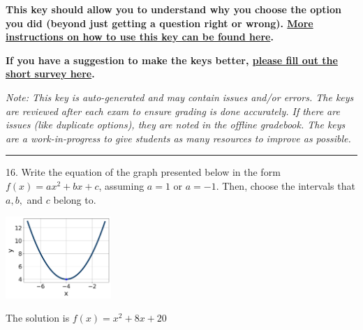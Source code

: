 \documentclass{article}[14pt]
\begin{document}
\textbf{This key should allow you to understand why you choose the option you did (beyond just getting a question right or wrong). \href{https://xronos.clas.ufl.edu/mac1105spring2020/courseDescriptionAndMisc/Exams/LearningFromResults}{More instructions on how to use this key can be found here}.}

\textbf{If you have a suggestion to make the keys better, \href{https://forms.gle/CZkbZmPbC9XALEE88}{please fill out the short survey here}.}

\textit{Note: This key is auto-generated and may contain issues and/or errors. The keys are reviewed after each exam to ensure grading is done accurately. If there are issues (like duplicate options), they are noted in the offline gradebook. The keys are a work-in-progress to give students as many resources to improve as possible.}

\rule{\textwidth}{0.4pt}

16. Write the equation of the graph presented below in the form $f(x)=ax^2+bx+c$, assuming  $a=1$ or $a=-1$. Then, choose the intervals that $a, b,$ and $c$ belong to.
\begin{center} \includegraphics[width=0.3\textwidth]{../Figures/quadraticGraphToEquationB.png} \end{center} 

The solution is $ f(x) = x^{2} +8 x + 20 $ 
\end{document}
